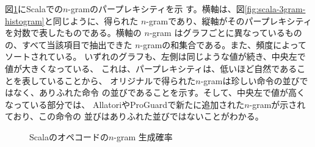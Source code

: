 \documentclass[12pt,twoside]{jbook}
\begin{document}
図\ref{fig:scala-perplexity}にScalaでの$n$-gramのパープレキシティを示
す。横軸は、図\ref{fig:scala-3gram-histogram}と同じように、得られた
$n$-gramであり、縦軸がそのパープレキシティを対数で表したものである。横軸の
$n$-gram はグラフごとに異なっているものの、すべて当該項目で抽出できた
$n$-gramの和集合である。また、頻度によってソートされている。
%
いずれのグラフも、左側は同じような値が続き、中央左で値が大きくなっている、
%
これは、パープレキシティは、低いほど自然であることを表していることから、
オリジナルで得られた$n$-gramは珍しい命令の並びではなく、ありふれた命令
の並びであることを示す。そして、中央左で値が高くなっている部分では、
AllatoriやProGuardで新たに追加された$n$-gramが示されており、この命令の
並びはありふれた並びではないことがわかる。

\begin{figure}[b]
  \centering
  \caption{Scalaのオペコードの$n$-gram 生成確率}\label{fig:scala-perplexity}
\end{figure}
\end{document}
